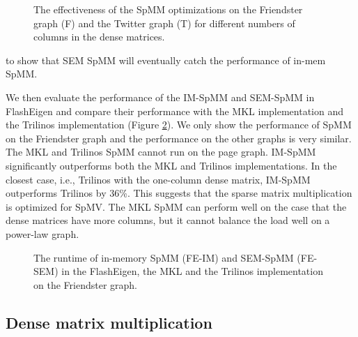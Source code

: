 
\begin{figure}
	\begin{center}
		\footnotesize
		\vspace{-15pt}
		
		\vspace{-15pt}
		\caption{The effectiveness of the SpMM optimizations on the Friendster
			graph (F) and the Twitter graph (T) for different numbers of
			columns in the dense matrices.}
		\label{perf:spmm_opt}
	\end{center}
\end{figure}

to show that SEM SpMM will eventually catch the performance of in-mem SpMM. 

We then evaluate the performance of the IM-SpMM and SEM-SpMM in FlashEigen
and compare their performance with the MKL implementation and the Trilinos
implementation (Figure \ref{perf:spmm}). We only show the performance of
SpMM on the Friendster graph and the performance on the other graphs is very
similar. The MKL and Trilinos SpMM cannot run on the page graph.
IM-SpMM significantly outperforms both the MKL and Trilinos implementations.
In the closest case, i.e., Trilinos with the one-column dense matrix,
IM-SpMM outperforms Trilinos by 36\%. This suggests that the sparse matrix
multiplication is optimized for SpMV. The MKL SpMM can perform well on
the case that the dense matrices have more columns, but it cannot balance
the load well on a power-law graph. 

\begin{figure}
	\begin{center}
		\footnotesize
		\vspace{-15pt}
		
		\vspace{-15pt}
		\caption{The runtime of in-memory SpMM (FE-IM) and SEM-SpMM (FE-SEM)
			in the FlashEigen, the MKL and the Trilinos implementation on
		the Friendster graph.}
		\label{perf:spmm}
	\end{center}
\end{figure}

\subsection{Dense matrix multiplication}

